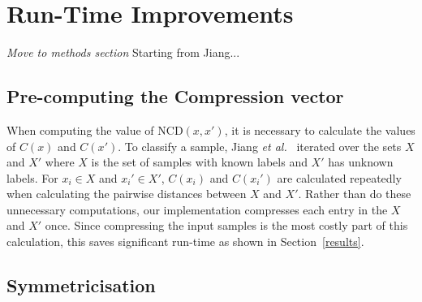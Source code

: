 \documentclass[preprint,12pt]{article}
\newcommand{\cm}[1]{\textit{{\color{blue}#1}}}
\begin{document}
\section{Run-Time Improvements}
\cm{Move to methods section}
\label{improvements}
Starting from Jiang...



\subsection{Pre-computing the Compression vector}
\label{pre_compute_compression}

When computing the value of NCD$(x,x')$, it is necessary to calculate the values of $C(x)$ and $C(x')$. 
To classify a sample, Jiang \textit{et al.}~\cite{jiang2022less} iterated over the sets $X$ and $X'$ where $X$ is the set of samples with known labels and $X'$ has unknown labels. 
For $x_i \in X$ and $x_i' \in X'$, $C(x_i)$ and $C(x_i')$ are calculated repeatedly when calculating the pairwise distances between $X$ and $X'$.
Rather than do these unnecessary computations, our implementation compresses each entry in the $X$ and $X'$ once. 
Since compressing the input samples is the most costly part of this calculation, this saves significant run-time as shown in Section~\ref{results}.

\subsection{Symmetricisation}
\label{modifications}
\end{document}
